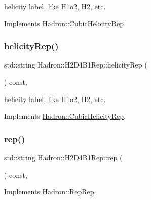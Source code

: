 helicity label, like H1o2, H2, etc. 

Implements \mbox{\hyperlink{structHadron_1_1CubicHelicityRep_af1096946b7470edf0a55451cc662f231}{Hadron\+::\+Cubic\+Helicity\+Rep}}.

\mbox{\label{structHadron_1_1H2D4B1Rep_a0d3def772b80e7f84ff2c62569ffa710}} 
\subsubsection{\texorpdfstring{helicityRep()}{helicityRep()}\hspace{0.1cm}{\footnotesize\ttfamily [3/3]}}
{\footnotesize\ttfamily std\+::string Hadron\+::\+H2\+D4\+B1\+Rep\+::helicity\+Rep (\begin{DoxyParamCaption}{ }\end{DoxyParamCaption}) const\hspace{0.3cm}{\ttfamily [inline]}, {\ttfamily [virtual]}}

helicity label, like H1o2, H2, etc. 

Implements \mbox{\hyperlink{structHadron_1_1CubicHelicityRep_af1096946b7470edf0a55451cc662f231}{Hadron\+::\+Cubic\+Helicity\+Rep}}.

\mbox{\label{structHadron_1_1H2D4B1Rep_a4f33e88c9985a78b47926b04736e7971}} 
\subsubsection{\texorpdfstring{rep()}{rep()}\hspace{0.1cm}{\footnotesize\ttfamily [1/5]}}
{\footnotesize\ttfamily std\+::string Hadron\+::\+H2\+D4\+B1\+Rep\+::rep (\begin{DoxyParamCaption}{ }\end{DoxyParamCaption}) const\hspace{0.3cm}{\ttfamily [inline]}, {\ttfamily [virtual]}}



Implements \mbox{\hyperlink{structHadron_1_1RepRep_ab3213025f6de249f7095892109575fde}{Hadron\+::\+Rep\+Rep}}.

\mbox{\label{structHadron_1_1H2D4B1Rep_a4f33e88c9985a78b47926b04736e7971}} 
